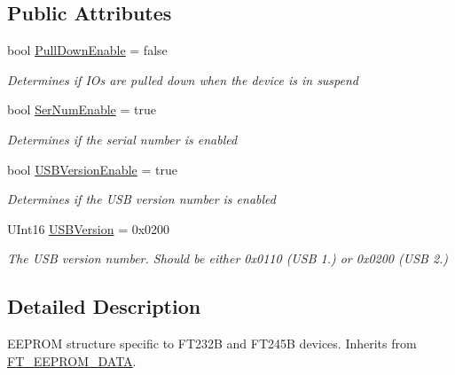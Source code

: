 \subsection*{Public Attributes}
\begin{DoxyCompactItemize}
\item 
bool \mbox{\hyperlink{class_f_t_d2_x_x___n_e_t_1_1_f_t_d_i_1_1_f_t232_b___e_e_p_r_o_m___s_t_r_u_c_t_u_r_e_a13e02a13c3ec6586a2b7e749d78970f1}{Pull\+Down\+Enable}} = false
\begin{DoxyCompactList}\small\item\em Determines if I\+Os are pulled down when the device is in suspend \end{DoxyCompactList}\item 
bool \mbox{\hyperlink{class_f_t_d2_x_x___n_e_t_1_1_f_t_d_i_1_1_f_t232_b___e_e_p_r_o_m___s_t_r_u_c_t_u_r_e_af0367824b795d477109315cbd8db01a7}{Ser\+Num\+Enable}} = true
\begin{DoxyCompactList}\small\item\em Determines if the serial number is enabled \end{DoxyCompactList}\item 
bool \mbox{\hyperlink{class_f_t_d2_x_x___n_e_t_1_1_f_t_d_i_1_1_f_t232_b___e_e_p_r_o_m___s_t_r_u_c_t_u_r_e_a3eb0833bf84b7d3b2c53f04e65a3ae6a}{U\+S\+B\+Version\+Enable}} = true
\begin{DoxyCompactList}\small\item\em Determines if the U\+SB version number is enabled \end{DoxyCompactList}\item 
U\+Int16 \mbox{\hyperlink{class_f_t_d2_x_x___n_e_t_1_1_f_t_d_i_1_1_f_t232_b___e_e_p_r_o_m___s_t_r_u_c_t_u_r_e_aa5b19994dbc0977998721b8daa45086c}{U\+S\+B\+Version}} = 0x0200
\begin{DoxyCompactList}\small\item\em The U\+SB version number. Should be either 0x0110 (U\+SB 1.) or 0x0200 (U\+SB 2.) \end{DoxyCompactList}\end{DoxyCompactItemize}


\subsection{Detailed Description}
E\+E\+P\+R\+OM structure specific to F\+T232B and F\+T245B devices. Inherits from \mbox{\hyperlink{class_f_t_d2_x_x___n_e_t_1_1_f_t_d_i_1_1_f_t___e_e_p_r_o_m___d_a_t_a}{F\+T\+\_\+\+E\+E\+P\+R\+O\+M\+\_\+\+D\+A\+TA}}. 



